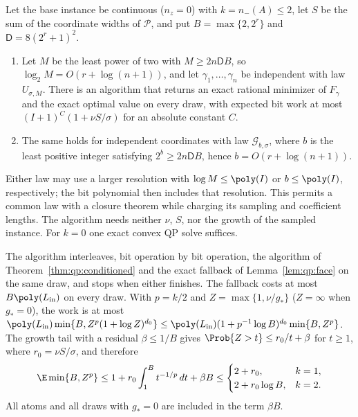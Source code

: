 \begin{theorem}\label{thm:qp:two}
Let the base instance be continuous ($n_z=0$) with $k=n_-(A)\le2$, let
$S$ be the sum of the coordinate widths of $\mathcal P$, and put
$B=\max\{2,2^r\}$ and $\mathsf D=8(2^r+1)^2$.
\begin{enumerate}[label=(\alph*)]
\item Let $M$ be the least power of two with $M\ge2n\mathsf DB$, so
 $\log_2M=O(r+\log(n+1))$, and let $\gamma_1,\dots,\gamma_n$ be independent
 with law $U_{\sigma,M}$. There is an algorithm that returns an exact
 rational minimizer of $F_\gamma$ and the exact optimal value on every draw,
 with expected bit work at most $(I+1)^{C}(1+\nu S/\sigma)$ for an absolute
 constant $C$.
\item The same holds for independent coordinates with law
 $\mathcal G_{b,\sigma}$, where $b$ is the least positive integer satisfying
 $2^b\ge2n\mathsf DB$, hence $b=O(r+\log(n+1))$.
\end{enumerate}
Either law may use a larger resolution with $\log M\le\poly(I)$ or
$b\le\poly(I)$, respectively; the bit polynomial then includes that
resolution. This permits a common law with a closure theorem while
charging its sampling and coefficient lengths.
The algorithm needs neither $\nu$, $S$, nor the growth of the sampled
instance. For $k=0$ one exact convex QP solve suffices.
\end{theorem}

The algorithm interleaves, bit operation by bit operation, the algorithm of
Theorem~\ref{thm:qp:conditioned} and the exact fallback of
Lemma~\ref{lem:qp:face} on the same draw, and stops when either finishes. The
fallback costs at most $B\poly(L_{\rm in})$ on every draw. With
$p=k/2$ and $Z=\max\{1,\nu/g_*\}$ ($Z=\infty$ when $g_*=0$), the work is at
most $\poly(L_{\rm in})\min\{B,Z^p(1+\log Z)^{d_0}\}\le
\poly(L_{\rm in})(1+p^{-1}\log B)^{d_0}\min\{B,Z^p\}$. The growth tail with a
residual $\beta\le1/B$ gives $\Prob\{Z>t\}\le r_0/t+\beta$ for $t\ge1$, where
$r_0=\nu S/\sigma$, and therefore
\[
 \E\min\{B,Z^p\}\le1+r_0\int_1^Bt^{-1/p}\,dt+\beta B
 \le\begin{cases}2+r_0,&k=1,\\ 2+r_0\log B,&k=2.\end{cases}
\]
All atoms and all draws with $g_*=0$ are included in the term $\beta B$.


